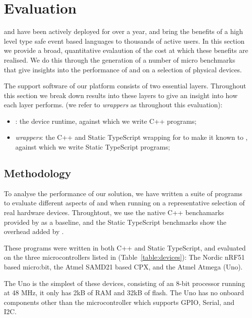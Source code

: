 \section{Evaluation}
\label{sec:evaluate}

\MC and \CO have been actively deployed for over a year, and bring the benefits of a 
high level type safe event based languages to thousands of active users. 
In this section we provide a broad, quantitative evalaution of the cost at which 
these benefits are realised. We do this through the generation of a number of micro 
benchmarks that give insights into the performance of \MC and \CO on a selection of 
physical devices. 

The support software of our platform consists of two essential layers. Throughout this
section we break down results into these layers to give an insight into how each layer performs.
(we refer to \emph{\MC wrappers} as \MC throughout this evaluation):

\begin{itemize}
\item \emph{\CO}: the device runtime, against which we write C++ programs;
\item \emph{\MC wrappers}: the C++ and Static TypeScript wrapping for \CO
to make it known to \MC, against which we write Static TypeScript programs;
\end{itemize}

\subsection{Methodology}

To analyse the performance of our solution, we have written a suite of programs to evaluate 
different aspects of \MC and \CO when running on a representative selection of real hardware devices. 
Throughtout, we use the native C++ benchamarks provided by \CO as a baseline, and the Static TypeScript benchmarks show the overhead
added by \MC. 

These programs were written in both C++ and Static TypeScript, and evaluated on the three microcontrollers 
listed in (Table~\ref{table:devices}): The Nordic nRF51 based micro:bit, the Atmel SAMD21 based CPX, and the Atmel Atmega (Uno). 

The Uno is the simplest of these devices, consisting of an 8-bit processor running at 48 MHz, 
it only has 2kB of RAM and 32kB of flash. 
The Uno has no onboard components other than the microcontroller which supports 
GPIO, Serial, and I2C.

